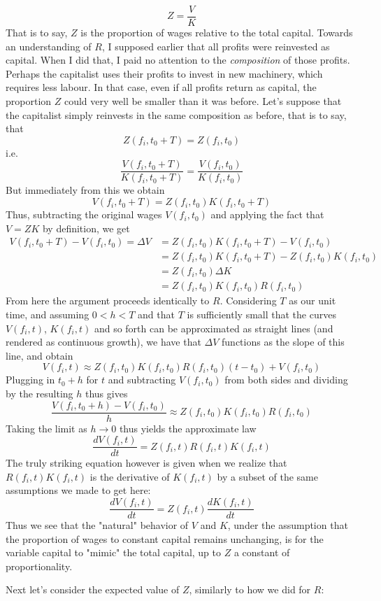 \documentclass{article}
\theoremstyle{definition}
\theoremstyle{plain}
\theoremstyle{theorem}
\begin{document}
\[ Z = \frac{V}{K} \]
That is to say, $Z$ is the proportion of wages relative to the total capital. Towards an understanding of $R$, I supposed earlier that all profits were reinvested as capital. When I did that, I paid no attention to the \textit{composition} of those profits. Perhaps the capitalist uses their profits to invest in new machinery, which requires less labour. In that case, even if all profits return as capital, the proportion $Z$ could very well be smaller than it was before. Let's suppose that the capitalist simply reinvests in the same composition as before, that is to say, that
\[ Z(f_i,t_0+T) = Z(f_i,t_0) \]
i.e.
\[ \frac{V(f_i,t_0+T)}{K(f_i,t_0+T)} = \frac{V(f_i,t_0)}{K(f_i,t_0)} \]
But immediately from this we obtain
\[ V(f_i,t_0+T) = Z(f_i,t_0)K(f_i,t_0+T) \]
Thus, subtracting the original wages $V(f_i,t_0)$ and applying the fact that $V = ZK$ by definition, we get 
\begin{align}
	V(f_i,t_0+T) - V(f_i,t_0) = \Delta V &= Z(f_i,t_0)K(f_i,t_0+T) - V(f_i,t_0) \\
	&= Z(f_i,t_0)K(f_i,t_0+T) - Z(f_i,t_0)K(f_i,t_0) \\
	&= Z(f_i,t_0)\Delta K \\
	&= Z(f_i,t_0)K(f_i,t_0)R(f_i,t_0)
\end{align}
From here the argument proceeds identically to $R$. Considering $T$ as our unit time, and assuming $0<h<T$ and that $T$ is sufficiently small that the curves $V(f_i,t)$, $K(f_i,t)$ and so forth can be approximated as straight lines (and rendered as continuous growth), we have that $\Delta V$ functions as the slope of this line, and obtain 
\[ V(f_i,t) \approx Z(f_i,t_0)K(f_i,t_0)R(f_i,t_0)(t-t_0)+V(f_i,t_0) \]
Plugging in $t_0+h$ for $t$ and subtracting $V(f_i,t_0)$ from both sides and dividing by the resulting $h$ thus gives
\[ \frac{V(f_i,t_0+h) - V(f_i,t_0)}{h} \approx Z(f_i,t_0)K(f_i,t_0)R(f_i,t_0) \]
Taking the limit as $h \to 0$ thus yields the approximate law
\[ \frac{dV(f_i,t)}{dt} = Z(f_i,t)R(f_i,t)K(f_i,t) \]
The truly striking equation however is given when we realize that $R(f_i,t)K(f_i,t)$ is the derivative of $K(f_i,t)$ by a subset of the same assumptions we made to get here:
\[ \frac{dV(f_i,t)}{dt} = Z(f_i,t)\frac{dK(f_i,t)}{dt} \] 
Thus we see that the "natural" behavior of $V$ and $K$, under the assumption that the proportion of wages to constant capital remains unchanging, is for the variable capital to "mimic" the total capital, up to $Z$ a constant of proportionality. \par
Next let's consider the expected value of $Z$, similarly to how we did for $R$:
\end{document}
